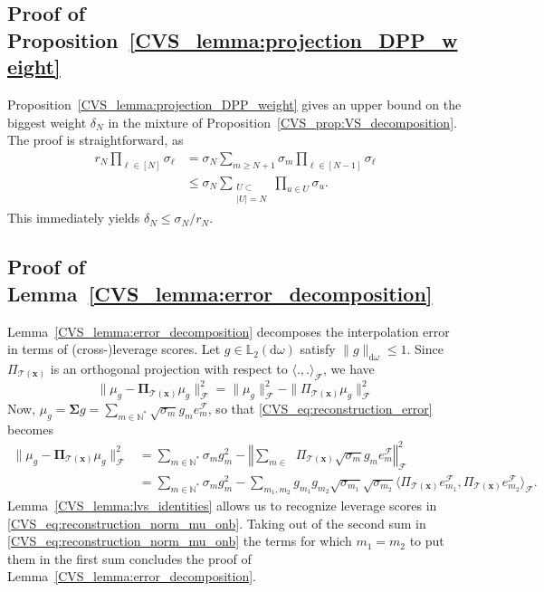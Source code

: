 \documentclass[twoside,11pt]{book}
\numberwithin{theorem}{chapter}
\numberwithin{definition}{chapter}
\numberwithin{proposition}{chapter}
\numberwithin{corollary}{chapter}
\numberwithin{example}{chapter}
\numberwithin{lemma}{chapter}
\numberwithin{assumption}{chapter}
\numberwithin{equation}{chapter}
\numberwithin{figure}{chapter}
\DeclareMathOperator{\F}{\mathcal{F}}
\def\Ltwo{\mathbb{L}_{2}(\mathrm{d} \omega)}
\DeclareMathOperator{\Ns}{\mathbb{N}^{*}}
\begin{document}
\subsection{Proof of Proposition~\ref{CVS_lemma:projection_DPP_weight}}
Proposition~\ref{CVS_lemma:projection_DPP_weight} gives an upper bound on the biggest weight $\delta_N$ in the mixture of Proposition~\ref{CVS_prop:VS_decomposition}. The proof is straightforward, as
\begin{align}\label{CVS_eq:r_N_delta_N_inequality}
r_{N} \prod\limits_{\ell \in [N]} \sigma_{\ell} & = \sigma_{N} \sum\limits_{m \geq N+1} \sigma_{m} \prod\limits_{\ell \in [N-1]} \sigma_{\ell} \nonumber\\
& \leq \sigma_{N} \sum\limits_{\substack{U \subset \Ns\\ |U| = N}} \prod\limits_{u \in U} \sigma_{u}.
\end{align}
This immediately yields $\delta_{N} \leq \sigma_{N}/r_{N}$.

\subsection{Proof of Lemma~\ref{CVS_lemma:error_decomposition}}\label{CVS_app:proof_error_decomposition}
Lemma~\ref{CVS_lemma:error_decomposition} decomposes the interpolation error in terms of (cross-)leverage scores. Let $g \in \Ltwo$ satisfy $\|g\|_{\mathrm{d}\omega} \leq 1$. Since $\Pi_{\mathcal{T}(\bm{x})}$ is an orthogonal projection with respect to $\langle .,. \rangle_{\F}$, we have
\begin{equation}\label{CVS_eq:reconstruction_error}
\|\mu_{g} - \bm{\Pi}_{\mathcal{T}(\bm{x})} \mu_{g}\|_{\F}^{2} = \|\mu_{g}\|_{\F}^{2} - \| \Pi_{\mathcal{T}(\bm{x})} \mu_{g}\|_{\F}^2
\end{equation}
Now, $\mu_{g} = \bm{\Sigma} g = \sum\limits_{m \in \mathbb{N}^{*}} \sqrt{\sigma_{m}} g_{m} e_{m}^{\F}$, so that \eqref{CVS_eq:reconstruction_error} becomes
\begin{align}
\|\mu_{g} - \bm{\Pi}_{\mathcal{T}(\bm{x})} \mu_{g}\|_{\F}^{2} & = \sum\limits_{m \in \mathbb{N}^{*}} \sigma_{m} g_{m}^{2} - \left\Vert \sum_{m \in \Ns} \Pi_{\mathcal{T}(\bm{x})}  \sqrt{\sigma_{m}} g_{m} e_{m}^{\F}\right\Vert_{\F}^2 \nonumber\\
& = \sum\limits_{m \in \mathbb{N}^{*}} \sigma_{m} g_{m}^{2} - \sum\limits_{m_{1}, m_2} g_{m_{1}} g_{m_{2}} \sqrt{\sigma_{m_{1}}} \sqrt{\sigma_{m_{2}}} \langle  \Pi_{\mathcal{T}(\bm{x})}   e_{m_{1}}^{\F}, \Pi_{\mathcal{T}(\bm{x})} e_{m_{2}}^{\F} \rangle_{\F}. \label{CVS_eq:reconstruction_norm_mu_onb}
\end{align}
Lemma~\ref{CVS_lemma:lvs_identities} allows us to recognize leverage scores in \eqref{CVS_eq:reconstruction_norm_mu_onb}. Taking out of the second sum in \eqref{CVS_eq:reconstruction_norm_mu_onb} the terms for which $m_1=m_2$ to put them in the first sum concludes the proof of Lemma~\ref{CVS_lemma:error_decomposition}.
\end{document}
